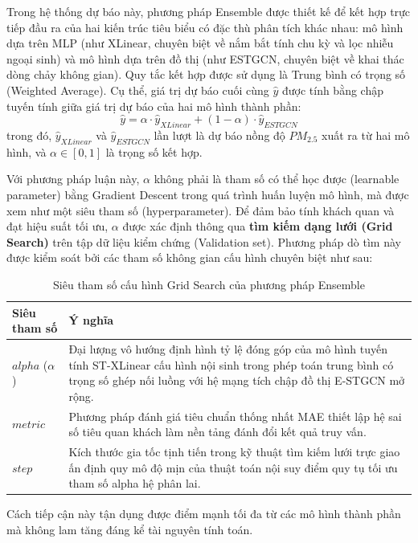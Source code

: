 Trong hệ thống dự báo này, phương pháp Ensemble được thiết kế để kết hợp trực tiếp đầu ra của hai kiến trúc tiêu biểu có đặc thù phân tích khác nhau: mô hình dựa trên MLP (như XLinear, chuyên biệt về nắm bắt tính chu kỳ và lọc nhiễu ngoại sinh) và mô hình dựa trên đồ thị (như ESTGCN, chuyên biệt về khai thác dòng chảy không gian). Quy tắc kết hợp được sử dụng là Trung bình có trọng số (Weighted Average). Cụ thể, giá trị dự báo cuối cùng $\hat{y}$ được tính bằng chập tuyến tính giữa giá trị dự báo của hai mô hình thành phần:
\begin{equation}
    \hat{y} = \alpha \cdot \hat{y}_{XLinear} + (1-\alpha) \cdot \hat{y}_{ESTGCN}
\end{equation}
trong đó, $\hat{y}_{XLinear}$ và $\hat{y}_{ESTGCN}$ lần lượt là dự báo nồng độ $PM_{2.5}$ xuất ra từ hai mô hình, và $\alpha \in [0, 1]$ là trọng số kết hợp.

Với phương pháp luận này, $\alpha$ không phải là tham số có thể học được (learnable parameter) bằng Gradient Descent trong quá trình huấn luyện mô hình, mà được xem như một siêu tham số (hyperparameter). Để đảm bảo tính khách quan và đạt hiệu suất tối ưu, $\alpha$ được xác định thông qua \textbf{tìm kiếm dạng lưới (Grid Search)} trên tập dữ liệu kiểm chứng (Validation set). Phương pháp dò tìm này được kiểm soát bởi các tham số không gian cấu hình chuyên biệt như sau:
\begin{table}[htbp]
\centering
\caption{Siêu tham số cấu hình Grid Search của phương pháp Ensemble}
\label{tab:ensemble_params}
\renewcommand{\arraystretch}{1.3}
\begin{tabular}{p{3.8cm} p{10.5cm}}
\toprule
\textbf{Siêu tham số} & \textbf{Ý nghĩa} \\
\midrule
$alpha$ ($\alpha$) & Đại lượng vô hướng định hình tỷ lệ đóng góp của mô hình tuyến tính ST-XLinear cấu hình nội sinh trong phép toán trung bình có trọng số ghép nối luồng với hệ mạng tích chập đồ thị E-STGCN mở rộng. \\
$metric$ & Phương pháp đánh giá tiêu chuẩn thống nhất MAE thiết lập hệ sai số tiêu quan khách làm nền tảng đánh đổi kết quả truy vấn. \\
$step$ & Kích thước gia tốc tịnh tiến trong kỹ thuật tìm kiếm lưới trực giao ấn định quy mô độ mịn của thuật toán nội suy điểm quy tụ tối ưu tham số alpha hệ phân lai. \\
\bottomrule
\end{tabular}
\end{table}
Cách tiếp cận này tận dụng được điểm mạnh tối đa từ các mô hình thành phần mà không lam tăng đáng kể tài nguyên tính toán.

